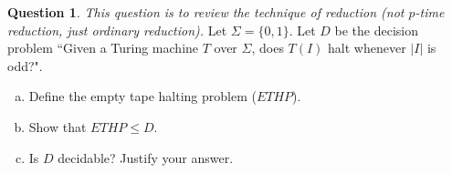 \documentclass{article}
\theoremstyle{definition}
\newtheorem{Q}{Question}
\begin{document}
\begin{Q}
\emph{This question is to review the technique of reduction (not $p$-time reduction, just ordinary reduction).} Let $\Sigma = \{0,1\}$. Let $D$ be the decision problem ``Given a Turing machine $T$ over $\Sigma$, does $T(I)$ halt whenever $|I|$ is odd?". 
\begin{enumerate}[a)]
\item Define the empty tape halting problem ($ETHP$).
\item Show that $ETHP \leq D$.
\item Is $D$ decidable? Justify your answer.
\end{enumerate}
\end{Q}
\begin{comment}
\textbf{Solution}
\begin{enumerate}[a)]
\item ``Given a Turing machine $T$, does $T$ halt when run on a blank tape?''.
\item An instance of $ETHP$ is a Turing machine $T$. An instance of $D$ is also a Turing machine. Given a Turing machine $T$ we will construct $T'$ such that $T$ halts on the empty input iff $T'(I)$ halts whenever $|I|$ is odd. $T'$ operates on an input $I$ as follows:
\begin{enumerate}[1)]
\item First $T'$ erases $I$ and moves the tape head back to the start of the tape.
\item $T'$ then does what $T$ do (note the tape is now empty).
\end{enumerate}
Then $T(\epsilon)$ halts implies $T'(I)$ halts for all $I$, so also whenever $|I|$ is odd. Conversely, $T'$ does the same thing for all inputs, and $T'(I)$ halts for all $I$ with $|I|$ odd implies $T(\epsilon)$ halts.
\item We conclude that $D$ is undecidable. As $ETHP\leq D$, an algorithm solving $D$ would imply an algorithm solving $ETHP$, which is impossible, as $ETHP$ is undecidable.
\end{enumerate}
\end{comment}
\end{document}
